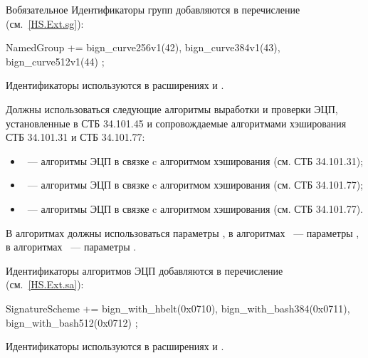 \begin{appendix}{В}{обязательное}
Идентификаторы групп добавляются в перечисление~
(см.~\ref{HS.Ext.sg}):
\begin{codeblock}
NamedGroup += {
  bign_curve256v1(42),
  bign_curve384v1(43),
  bign_curve512v1(44)
};
\end{codeblock}

Идентификаторы используются в расширениях  
и .

\label{BSUITES.DS}

Должны использоваться следующие алгоритмы выработки и проверки ЭЦП,
установленные в СТБ 34.101.45 и сопровождаемые алгоритмами хэширования 
СТБ 34.101.31 и СТБ 34.101.77:
\begin{itemize}
\item
{}~--- алгоритмы ЭЦП в связке c алгоритмом хэширования 
 (см. СТБ 34.101.31);
\item
{}~--- алгоритмы ЭЦП в связке c алгоритмом хэширования 
 (см. СТБ 34.101.77);
\item
{}~--- алгоритмы ЭЦП в связке c алгоритмом хэширования 
 (см. СТБ 34.101.77).
\end{itemize}

В алгоритмах  должны использоваться параметры
, в алгоритмах ~--- 
параметры , в алгоритмах ~--- 
параметры .

Идентификаторы алгоритмов ЭЦП добавляются в перечисление~
(см.~\ref{HS.Ext.sa}):
\begin{codeblock}
SignatureScheme += {
  bign_with_hbelt(0x0710),
  bign_with_bash384(0x0711),
  bign_with_bash512(0x0712)
};
\end{codeblock}

Идентификаторы используются в расширениях  
и .

\end{appendix}
\mbox{}
\vfill
\mbox{}
\clearpage
